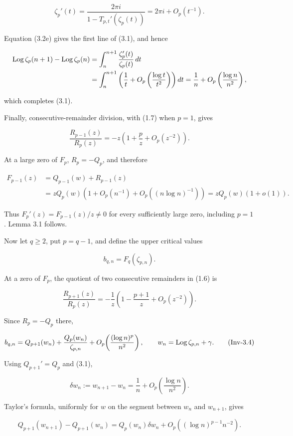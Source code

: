 \[
 \zeta_p'(t)=\frac{2\pi i}{1-T_{p,t}'(\zeta_p(t))}
 =2\pi i+O_p(t^{-1}).
\]

Equation (3.2e) gives the first line of (3.1), and hence

\[
 \begin{aligned}
 \operatorname{Log}\zeta_p(n+1)-\operatorname{Log}\zeta_p(n)
 &=\int_n^{n+1}\frac{\zeta_p'(t)}{\zeta_p(t)}\,dt\\
 &=\int_n^{n+1}\left(\frac1t
    +O_p\left(\frac{\log t}{t^2}\right)\right)dt
 =\frac1n+O_p\left(\frac{\log n}{n^2}\right),
 \end{aligned}
\]

which completes (3.1).

Finally, consecutive-remainder division, with (1.7) when \(p=1\), gives

\[
 \frac{R_{p-1}(z)}{R_p(z)}
 =-z\left(1+\frac pz+O_p(z^{-2})\right).
\tag{Inv-3.2g}
\]

At a large zero of \(F_p\), \(R_p=-Q_p\), and therefore

\[
 \begin{aligned}
 F_{p-1}(z)
 &=Q_{p-1}(w)+R_{p-1}(z)\\
 &=zQ_p(w)\left(1+O_p(n^{-1})
   +O_p((n\log n)^{-1})\right)
 =zQ_p(w)(1+o(1)).
 \end{aligned}
\tag{Inv-3.3}
\]

Thus \(F_p'(z)=F_{p-1}(z)/z\ne0\) for every sufficiently large zero,
including \(p=1\). Lemma 3.1 follows.

Now let \(q\geq2\), put \(p=q-1\), and define the upper critical values

\[
 b_{q,n}=F_q(\zeta_{p,n}).
\]

At a zero of \(F_p\), the quotient of two consecutive remainders in (1.6)
is

\[
 \frac{R_{p+1}(z)}{R_p(z)}
 =-\frac1z\left(1-\frac{p+1}{z}+O_p(z^{-2})\right).
\]

Since \(R_p=-Q_p\) there,

\[
 b_{q,n}=Q_{p+1}(w_n)+\frac{Q_p(w_n)}{\zeta_{p,n}}
 +O_p\!\left(\frac{(\log n)^p}{n^2}\right),
 \qquad w_n=\operatorname{Log}\zeta_{p,n}+\gamma.
\tag{Inv-3.4}
\]

Using \(Q_{p+1}'=Q_p\) and (3.1),

\[
 \delta w_n:=w_{n+1}-w_n
 =\frac1n+O_p\!\left(\frac{\log n}{n^2}\right).
\]

Taylor's formula, uniformly for \(w\) on the segment between \(w_n\) and
\(w_{n+1}\), gives

\[
 Q_{p+1}(w_{n+1})-Q_{p+1}(w_n)
 =Q_p(w_n)\delta w_n+O_p((\log n)^{p-1}n^{-2}).
\]

